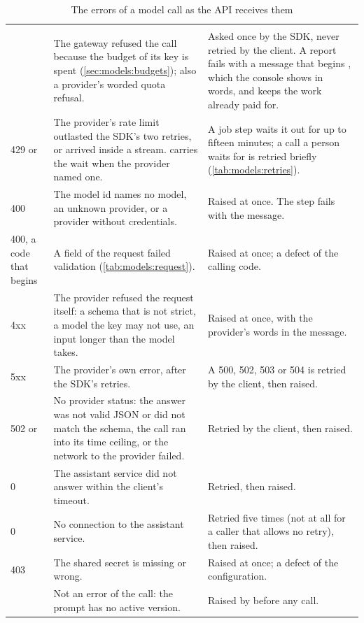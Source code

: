 \begin{xltabular}{\textwidth}{@{}L{41mm}L{50mm}Y@{}}
\caption{The errors of a model call as the API receives them}\label{tab:models:errors}\\
\toprule
{} &  &  \\
\midrule
\endfirsthead
\toprule
{} &  &  \\
\midrule
\endhead
\bottomrule
{}  & The gateway refused the call because the budget of its key is spent (\cref{sec:models:budgets}); also a provider's worded quota refusal. & Asked once by the SDK, never retried by the client. A report fails with a message that begins , which the console shows in words, and keeps the work already paid for. \\
429  or  & The provider's rate limit outlasted the SDK's two retries, or arrived inside a stream.  carries the wait when the provider named one. & A job step waits it out for up to fifteen minutes; a call a person waits for is retried briefly (\cref{tab:models:retries}). \\
400  & The model id names no model, an unknown provider, or a provider without credentials. & Raised at once. The step fails with the message. \\
400, a code that begins  & A field of the request failed validation (\cref{tab:models:request}). & Raised at once; a defect of the calling code. \\
4xx  & The provider refused the request itself: a schema that is not strict, a model the key may not use, an input longer than the model takes. & Raised at once, with the provider's words in the message. \\
5xx  & The provider's own error, after the SDK's retries. & A 500, 502, 503 or 504 is retried by the client, then raised. \\
502  or  & No provider status: the answer was not valid JSON or did not match the schema, the call ran into its time ceiling, or the network to the provider failed. & Retried by the client, then raised. \\
0  & The assistant service did not answer within the client's timeout. & Retried, then raised. \\
0  & No connection to the assistant service. & Retried five times (not at all for a caller that allows no retry), then raised. \\
403  & The shared secret is missing or wrong. & Raised at once; a defect of the configuration. \\
 & Not an error of the call: the prompt has no active version. & Raised by  before any call. \\
\end{xltabular}

